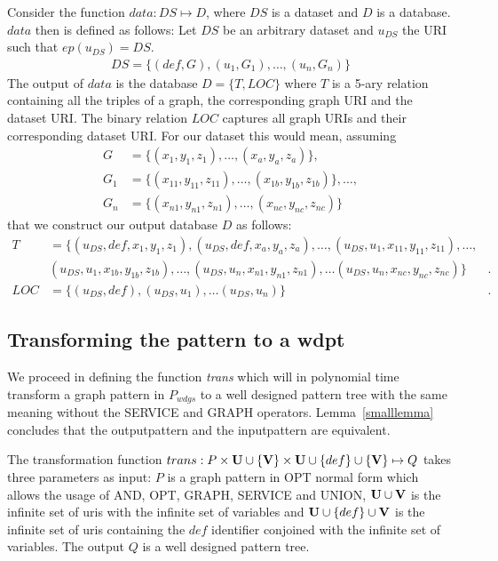 Consider the function $data: DS \mapsto D$, where $DS$ is a
dataset and $D$ is a database.
$data$ then is defined as follows:
Let $DS$ be an arbitrary dataset and $u_{DS}$ the URI such that $ep(u_{DS}) = DS$.
\begin{align*}
	DS=\{(def,G),(u_1,G_1),\dots,(u_n,G_n)\}
\end{align*}
The output of $data$ is the database $D = \{ T,LOC\}$ where $T$ is a 5-ary relation containing all the triples of a graph, the corresponding graph URI and the dataset URI. The binary relation $LOC$
captures all graph URIs and their corresponding dataset URI. 
For our dataset this would mean, assuming 
\begin{align*}
	G &= \{(x_1,y_1,z_1), \dots, (x_a,y_a,z_a)\},\\ 
	G_1 &= \{(x_{11}, y_{11},z_{11}), \dots, (x_{1b},y_{1b},z_{1b}) \},\dots,\\ 
	G_n &= \{(x_{n1},y_{n1},z_{n1}),\dots,(x_{nc},y_{nc},z_{nc})\}
\end{align*} that we construct our output database $D$ as follows:
\begin{align*}
	T &= \{ (u_{DS},def,x_1,y_1,z_1), (u_{DS},def,x_a,y_a,z_a), \dots, (u_{DS},u_1,x_{11}, y_{11},z_{11}),
	\dots,\\& (u_{DS},u_1,x_{1b},y_{1b},z_{1b} ), \dots,
(u_{DS},u_n,x_{n1},y_{n1},z_{n1}), \dots (u_{DS},u_n,x_{nc},y_{nc},z_{nc})\}&. \\
	LOC &= \{ (u_{DS},def),(u_{DS},u_1),\dots (u_{DS},u_n) \}&.
\end{align*}

\subsection{Transforming the pattern to a wdpt}
We proceed in defining the function \textit{trans} which will in polynomial time 
transform a graph pattern in $P_{wdgs}$ to a well designed pattern tree with the same meaning without the
SERVICE and GRAPH operators. Lemma~\ref{smalllemma} concludes that the outputpattern and the
inputpattern are equivalent.

\bigskip\noindent
The transformation function $trans: P \times \mathbf{U}\cup\{\mathbf{V}\} \times \mathbf{U} \cup \{def \}\cup\{\mathbf{V}\}
\mapsto Q$ takes  three parameters as input: 
$P$ is a graph pattern in OPT normal form which allows the usage of AND, OPT, GRAPH, SERVICE and
UNION, $\mathbf{U}\cup\mathbf{V}$ is the infinite
set of uris with the infinite set of variables and $\mathbf{U}\cup\{def\}\cup \mathbf{V}$ is the infinite set of
uris containing the $def$ identifier conjoined with the infinite set of
variables. The output $Q$ is a well designed pattern tree. 

